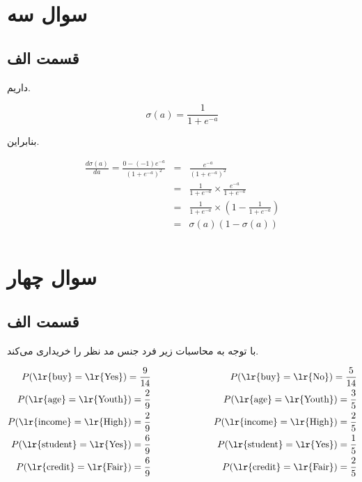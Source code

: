 \documentclass{article}
\begin{document}
\section*{سوال سه}

\subsection*{قسمت الف}

داریم.

$$\sigma(a) = \frac{1}{1+e^{-a}}$$

بنابراین.

\begin{eqnarray*}
    \frac{d\sigma(a)}{da} = \frac{0-(-1)e^{-a}}{(1+e^{-a})^2} & = & \frac{e^{-a}}{(1+e^{-a})^2} \\
    & = & \frac{1}{1+e^{-a}} \times \frac{e^{-a}}{1+e^{-a}} \\
    & = & \frac{1}{1+e^{-a}} \times (1 - \frac{1}{1+e^{-a}}) \\
    & = & \sigma(a) (1-\sigma(a)) \\
\end{eqnarray*}

\section*{سوال چهار}

\subsection*{قسمت الف}

با توجه به محاسبات زیر فرد  جنس مد نظر را خریداری می‌کند.

\begin{eqnarray*}
    P(\text{\lr{buy}}=\text{\lr{Yes}}) = \frac{9}{14} & \hspace{2cm} & P(\text{\lr{buy}}=\text{\lr{No}}) = \frac{5}{14}\\
    P(\text{\lr{age}}=\text{\lr{Youth}}) = \frac{2}{9} & \hspace{2cm} & P(\text{\lr{age}}=\text{\lr{Youth}}) = \frac{3}{5}\\
    P(\text{\lr{income}}=\text{\lr{High}}) = \frac{2}{9} & \hspace{2cm} & P(\text{\lr{income}}=\text{\lr{High}}) = \frac{2}{5}\\
    P(\text{\lr{student}}=\text{\lr{Yes}}) = \frac{6}{9} & \hspace{2cm} & P(\text{\lr{student}}=\text{\lr{Yes}}) = \frac{1}{5}\\
    P(\text{\lr{credit}}=\text{\lr{Fair}}) = \frac{6}{9} & \hspace{2cm} & P(\text{\lr{credit}}=\text{\lr{Fair}}) = \frac{2}{5}\\
\end{eqnarray*}
\end{document}
